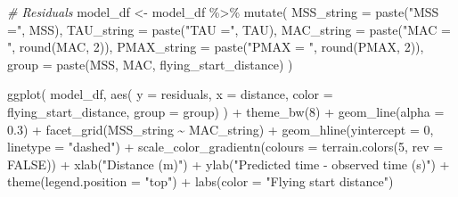 \documentclass[fleqn,10pt,lineno]{wlpeerj} %
\newenvironment{Shaded}{\begin{snugshade}}{\end{snugshade}}
\newcommand{\AttributeTok}[1]{\textcolor[rgb]{0.77,0.63,0.00}{#1}}
\newcommand{\CommentTok}[1]{\textcolor[rgb]{0.56,0.35,0.01}{\textit{#1}}}
\newcommand{\ConstantTok}[1]{\textcolor[rgb]{0.00,0.00,0.00}{#1}}
\newcommand{\DecValTok}[1]{\textcolor[rgb]{0.00,0.00,0.81}{#1}}
\newcommand{\FloatTok}[1]{\textcolor[rgb]{0.00,0.00,0.81}{#1}}
\newcommand{\FunctionTok}[1]{\textcolor[rgb]{0.00,0.00,0.00}{#1}}
\newcommand{\NormalTok}[1]{#1}
\newcommand{\OtherTok}[1]{\textcolor[rgb]{0.56,0.35,0.01}{#1}}
\newcommand{\SpecialCharTok}[1]{\textcolor[rgb]{0.00,0.00,0.00}{#1}}
\newcommand{\StringTok}[1]{\textcolor[rgb]{0.31,0.60,0.02}{#1}}
\begin{document}
\begin{Shaded}
\begin{Highlighting}[]
\CommentTok{\# Residuals}
\NormalTok{model\_df }\OtherTok{\textless{}{-}}\NormalTok{ model\_df }\SpecialCharTok{\%\textgreater{}\%}
  \FunctionTok{mutate}\NormalTok{(}
    \AttributeTok{MSS\_string =} \FunctionTok{paste}\NormalTok{(}\StringTok{"MSS ="}\NormalTok{, MSS),}
    \AttributeTok{TAU\_string =} \FunctionTok{paste}\NormalTok{(}\StringTok{"TAU ="}\NormalTok{, TAU),}
    \AttributeTok{MAC\_string =} \FunctionTok{paste}\NormalTok{(}\StringTok{"MAC = "}\NormalTok{, }\FunctionTok{round}\NormalTok{(MAC, }\DecValTok{2}\NormalTok{)),}
    \AttributeTok{PMAX\_string =} \FunctionTok{paste}\NormalTok{(}\StringTok{"PMAX = "}\NormalTok{, }\FunctionTok{round}\NormalTok{(PMAX, }\DecValTok{2}\NormalTok{)),}
    \AttributeTok{group =} \FunctionTok{paste}\NormalTok{(MSS, MAC, flying\_start\_distance)}
\NormalTok{  )}

\FunctionTok{ggplot}\NormalTok{(}
\NormalTok{  model\_df,}
  \FunctionTok{aes}\NormalTok{(}
    \AttributeTok{y =}\NormalTok{ residuals,}
    \AttributeTok{x =}\NormalTok{ distance,}
    \AttributeTok{color =}\NormalTok{ flying\_start\_distance,}
    \AttributeTok{group =}\NormalTok{ group)}
\NormalTok{) }\SpecialCharTok{+}
  \FunctionTok{theme\_bw}\NormalTok{(}\DecValTok{8}\NormalTok{) }\SpecialCharTok{+}
  \FunctionTok{geom\_line}\NormalTok{(}\AttributeTok{alpha =} \FloatTok{0.3}\NormalTok{) }\SpecialCharTok{+}
  \FunctionTok{facet\_grid}\NormalTok{(MSS\_string }\SpecialCharTok{\textasciitilde{}}\NormalTok{ MAC\_string) }\SpecialCharTok{+}
  \FunctionTok{geom\_hline}\NormalTok{(}\AttributeTok{yintercept =} \DecValTok{0}\NormalTok{, }\AttributeTok{linetype =} \StringTok{"dashed"}\NormalTok{) }\SpecialCharTok{+}
  \FunctionTok{scale\_color\_gradientn}\NormalTok{(}\AttributeTok{colours =} \FunctionTok{terrain.colors}\NormalTok{(}\DecValTok{5}\NormalTok{, }\AttributeTok{rev =} \ConstantTok{FALSE}\NormalTok{)) }\SpecialCharTok{+}
  \FunctionTok{xlab}\NormalTok{(}\StringTok{"Distance (m)"}\NormalTok{) }\SpecialCharTok{+}
  \FunctionTok{ylab}\NormalTok{(}\StringTok{"Predicted time {-} observed time (s)"}\NormalTok{) }\SpecialCharTok{+}
  \FunctionTok{theme}\NormalTok{(}\AttributeTok{legend.position =} \StringTok{"top"}\NormalTok{) }\SpecialCharTok{+} 
  \FunctionTok{labs}\NormalTok{(}\AttributeTok{color =} \StringTok{"Flying start distance"}\NormalTok{)}
\end{Highlighting}
\end{Shaded}
\end{document}
